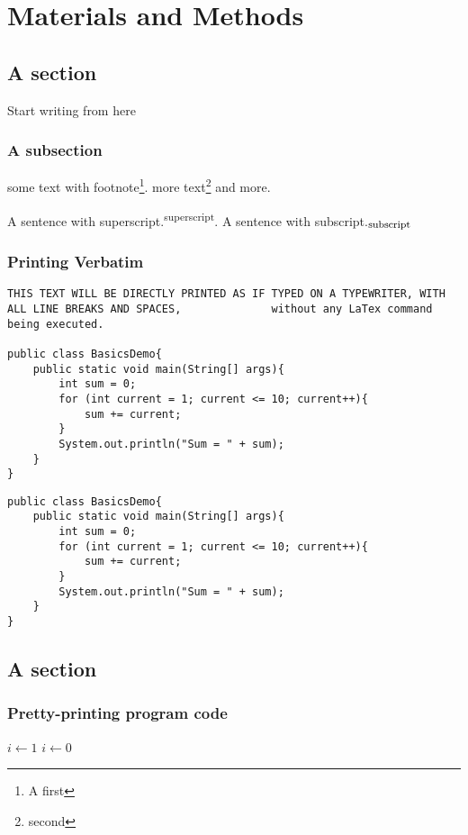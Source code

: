 \chapter{Materials and Methods}
\section{A section}
Start writing from here~\cite{ConcreteMath}
\subsection{A subsection}
some text with footnote\footnote{A first}. more
text\footnote{second} and more.

A sentence with superscript.\textsuperscript{superscript}. A
sentence with subscript.$_{\mbox{\footnotesize{subscript}}}$

\subsection{Printing Verbatim}
\begin{verbatim}
THIS TEXT WILL BE DIRECTLY PRINTED AS IF TYPED ON A TYPEWRITER, WITH
ALL LINE BREAKS AND SPACES,              without any LaTex command
being executed.

public class BasicsDemo{
    public static void main(String[] args){
        int sum = 0;
        for (int current = 1; current <= 10; current++){
            sum += current;
        }
        System.out.println("Sum = " + sum);
    }
}
\end{verbatim}

\begin{Verbatim}[frame=single, xrightmargin=2pc]
public class BasicsDemo{
    public static void main(String[] args){
        int sum = 0;
        for (int current = 1; current <= 10; current++){
            sum += current;
        }
        System.out.println("Sum = " + sum);
    }
}
\end{Verbatim}

\section{A section}
\subsection{Pretty-printing program code}
\singlespacing
\begin{algorithmic}
 \STATE $i\gets1$ \ELSE {} \STATE
$i\gets0$ \ENDIF \ENDIF
\end{algorithmic}

